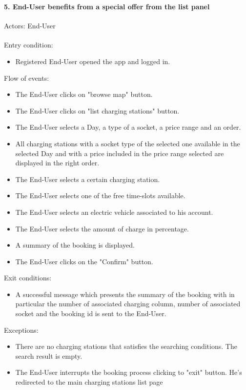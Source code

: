 \documentclass[a4paper]{report}
\begin{document}
\textbf{5. End-User benefits from a special offer from the list panel}\label{uc:5}
\\ \\
Actors: End-User \\ \\
Entry condition:
\begin{itemize}
\item Registered End-User opened the app and logged in.
\end{itemize}
Flow of events:
\begin{itemize}
\item The End-User clicks on "browse map" button.
\item The End-User clicks on "list charging stations" button.
\item The End-User selects a Day, a type of a socket, a price range and an order.
\item All charging stations with a socket type of the selected one available in the selected Day and with a price included in the price range selected are displayed in the right order.
\item The End-User selects a certain charging station.
\item The End-User selects one of the free time-slots available.
\item The End-User selects an electric vehicle associated to his account.
\item The End-User selects the amount of charge in percentage.
\item A summary of the booking is displayed.
\item The End-User clicks on the "Confirm" button.
\end{itemize}
Exit conditions:
\begin{itemize}
\item A successful message which presents the summary of the booking with in particular the number of associated charging column, number of associated socket and the booking id is sent to the End-User.
 \end{itemize}
Exceptions: 
 \begin{itemize}
 \item There are no charging stations that satisfies the searching conditions. The search result is empty.
 \item The End-User interrupts the booking process clicking to "exit" button. He's redirected to the main charging stations list page
\end{itemize}
\end{document}
